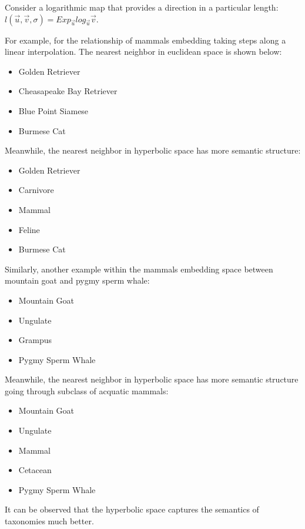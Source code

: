  Consider a logarithmic map that provides a direction in a particular length:
 $l(\vec{u},\vec{v},\sigma)= Exp_{\vec{u}} log_{\vec{u}}\vec{v}$.
 
 For example, for the relationship of mammals embedding taking steps along a linear interpolation. The nearest neighbor in euclidean space is shown below:
\begin{itemize}
    \item Golden Retriever
    \item Cheasapeake Bay Retriever
    \item Blue Point Siamese
    \item Burmese Cat
\end{itemize}

Meanwhile, the nearest neighbor in hyperbolic space has more semantic structure:
\begin{itemize}
    \item Golden Retriever
    \item Carnivore
    \item Mammal
    \item Feline
    \item Burmese Cat
\end{itemize}

Similarly, another example within the mammals embedding space between mountain goat and pygmy sperm whale:
\begin{itemize}
    \item Mountain Goat
    \item Ungulate
    \item Grampus
    \item Pygmy Sperm Whale
\end{itemize}

Meanwhile, the nearest neighbor in hyperbolic space has more semantic structure going through subclass of acquatic mammals:
\begin{itemize}
    \item Mountain Goat
    \item Ungulate
    \item Mammal
    \item Cetacean
    \item Pygmy Sperm Whale
\end{itemize}

It can be observed that the hyperbolic space captures the semantics of taxonomies much better.

